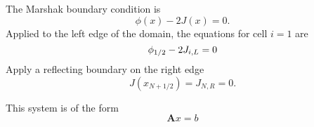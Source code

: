 The Marshak boundary condition is 
	\begin{equation}
		\phi(x) - 2J(x) = 0. 
	\end{equation}
Applied to the left edge of the domain, the equations for cell $i=1$ are 
	\begin{equation}
		\phi_{1/2} - 2J_{i,L} = 0
	\end{equation}
Apply a reflecting boundary on the right edge 
	\begin{equation}
		J(x_{N+1/2}) = J_{N,R} = 0. 
	\end{equation}

This system is of the form 
	\begin{equation}
		\pmb{A} x = b
	\end{equation}
